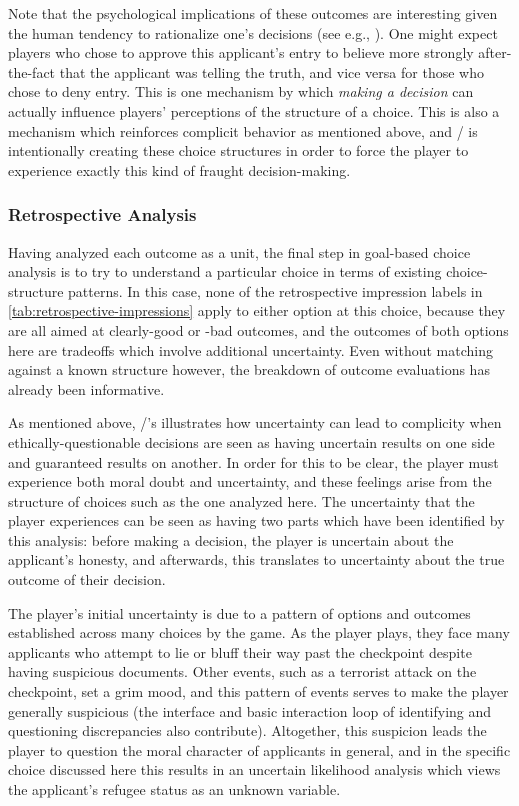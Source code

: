 Note that the psychological implications of these outcomes are interesting given the human tendency to rationalize one's decisions (see e.g., \citep{Hall2012}).
%
One might expect players who chose to approve this applicant's entry to believe more strongly after-the-fact that the applicant was telling the truth, and vice versa for those who chose to deny entry.
%
This is one mechanism by which \emph{making a decision} can actually influence players' perceptions of the structure of a choice.
%
This is also a mechanism which reinforces complicit behavior as mentioned above, and \papersplease/ is intentionally creating these choice structures in order to force the player to experience exactly this kind of fraught decision-making.


\subsubsection{Retrospective Analysis}

Having analyzed each outcome as a unit, the final step in goal-based choice analysis is to try to understand a particular choice in terms of existing choice-structure patterns.
%
In this case, none of the retrospective impression labels in \cref{tab:retrospective-impressions} apply to either option at this choice, because they are all aimed at clearly-good or -bad outcomes, and the outcomes of both options here are tradeoffs which involve additional uncertainty.
%
Even without matching against a known structure however, the breakdown of outcome evaluations has already been informative.


As mentioned above, \papersplease/'s illustrates how uncertainty can lead to complicity when ethically-questionable decisions are seen as having uncertain results on one side and guaranteed results on another.
%
In order for this to be clear, the player must experience both moral doubt and uncertainty, and these feelings arise from the structure of choices such as the one analyzed here.
%
The uncertainty that the player experiences can be seen as having two parts which have been identified by this analysis: before making a decision, the player is uncertain about the applicant's honesty, and afterwards, this translates to uncertainty about the true outcome of their decision.


The player's initial uncertainty is due to a pattern of options and outcomes established across many choices by the game.
%
As the player plays, they face many applicants who attempt to lie or bluff their way past the checkpoint despite having suspicious documents.
%
Other events, such as a terrorist attack on the checkpoint, set a grim mood, and this pattern of events serves to make the player generally suspicious (the interface and basic interaction loop of identifying and questioning discrepancies also contribute).
%
Altogether, this suspicion leads the player to question the moral character of applicants in general, and in the specific choice discussed here this results in an uncertain likelihood analysis which views the applicant's refugee status as an unknown variable.


